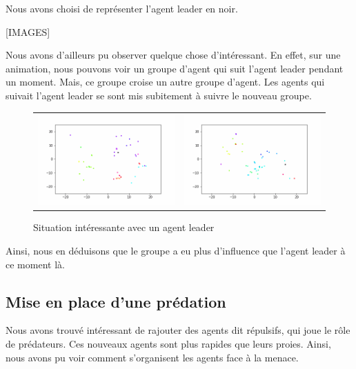\documentclass[french, a4paper, 12pt, openany]{report}
\begin{document}
       Nous avons choisi de représenter l'agent leader en noir.
       
       [IMAGES]
    
       
       Nous avons d'ailleurs pu observer quelque chose d'intéressant. En effet, sur une animation, nous pouvons voir un groupe d'agent qui suit l'agent leader pendant un moment. Mais, ce groupe croise un autre groupe d'agent. Les agents qui suivait l'agent leader se sont mis subitement à suivre le nouveau groupe. 
       
       \begin{figure}[!h]
		\centering
		\begin{tabular}{cc}
			\includegraphics[width=8cm]{images/image_13.png} & \includegraphics[width=8cm]{images/image_14.png} \\
		\end{tabular}
		\caption{Situation intéressante avec un agent leader}
	\end{figure}
       
       Ainsi, nous en déduisons que le groupe a eu plus d'influence que l'agent leader à ce moment là.
       
       
   \subsection{Mise en place d'une prédation}
       
       Nous avons trouvé intéressant de rajouter des agents dit répulsifs, qui joue le rôle de prédateurs. Ces nouveaux agents sont plus rapides que leurs proies. Ainsi, nous avons pu voir comment s'organisent les agents face à la menace. 
       
\end{document}
